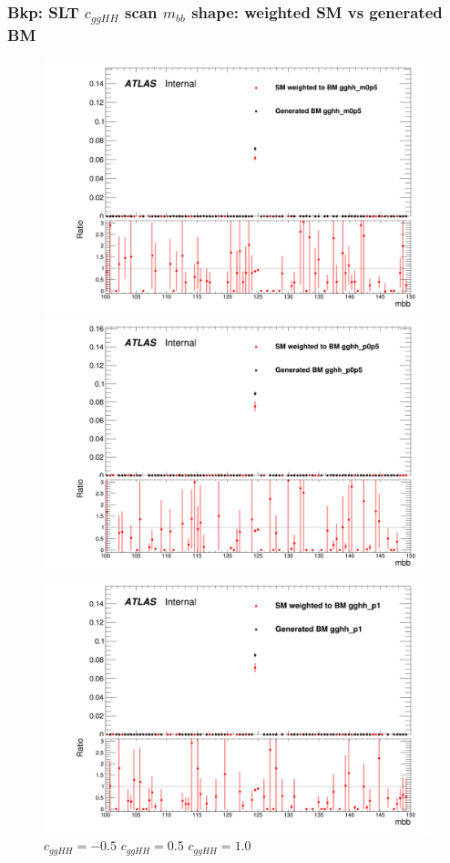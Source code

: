 \documentclass[twoside,11pt]{beamer}
\begin{document}
\begin{frame}
    \frametitle{Bkp: SLT $c_{ggHH}$ scan $m_{bb}$ shape: weighted SM vs generated BM}

    \begin{figure}
    \includegraphics[width=.32\textwidth]{figures/Method_B_all_latest/BMgghh_m0p5h_mbb.png}
    \includegraphics[width=.32\textwidth]{figures/Method_B_all_latest/BMgghh_p0p5h_mbb.png}
    \includegraphics[width=.32\textwidth]{figures/Method_B_all_latest/BMgghh_p1h_mbb.png}
    $c_{ggHH} = -0.5$ \hspace{5em} $c_{ggHH} = 0.5$\hspace{5em} $c_{ggHH} = 1.0$
    \end{figure}


\end{frame}     
\end{document}
